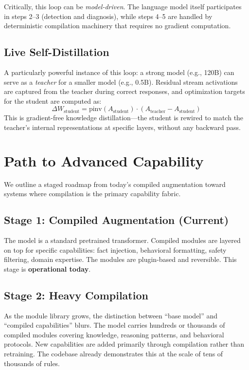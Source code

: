 \documentclass[11pt,a4paper]{article}
\begin{document}
Critically, this loop can be \emph{model-driven}. The language model itself participates in steps 2--3 (detection and diagnosis), while steps 4--5 are handled by deterministic compilation machinery that requires no gradient computation.

\subsection{Live Self-Distillation}

A particularly powerful instance of this loop: a strong model (e.g., 120B) can serve as a \emph{teacher} for a smaller model (e.g., 0.5B). Residual stream activations are captured from the teacher during correct responses, and optimization targets for the student are computed as:
\[
\Delta W_{\text{student}} = \text{pinv}(A_{\text{student}}) \cdot (A_{\text{teacher}} - A_{\text{student}})
\]
This is gradient-free knowledge distillation---the student is rewired to match the teacher's internal representations at specific layers, without any backward pass.

\section{Path to Advanced Capability}

We outline a staged roadmap from today's compiled augmentation toward systems where compilation is the primary capability fabric.

\subsection{Stage 1: Compiled Augmentation (Current)}

The model is a standard pretrained transformer. Compiled modules are layered on top for specific capabilities: fact injection, behavioral formatting, safety filtering, domain expertise. The modules are plugin-based and reversible. This stage is \textbf{operational today}.

\subsection{Stage 2: Heavy Compilation}

As the module library grows, the distinction between ``base model'' and ``compiled capabilities'' blurs. The model carries hundreds or thousands of compiled modules covering knowledge, reasoning patterns, and behavioral protocols. New capabilities are added primarily through compilation rather than retraining. The codebase already demonstrates this at the scale of tens of thousands of rules.
\end{document}
